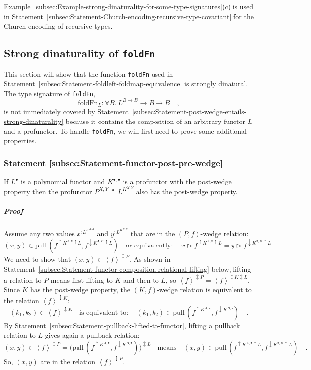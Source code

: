 Example~\ref{subsec:Example-strong-dinaturality-for-some-type-signatures}(c)
is used in Statement~\ref{subsec:Statement-Church-encoding-recursive-type-covariant}
for the Church encoding of recursive types.

\subsection{Strong dinaturality of \texttt{foldFn}}

This section will show that the function \lstinline!foldFn! used
in Statement~\ref{subsec:Statement-foldleft-foldmap-equivalence}
is strongly dinatural. The type signature of \lstinline!foldFn!,
\[
\text{foldFn}_{L}:\forall B.\,L^{B\rightarrow B}\rightarrow B\rightarrow B\quad,
\]
is not immediately covered by Statement~\ref{subsec:Statement-post-wedge-entails-strong-dinaturality}
because it contains the composition of an arbitrary functor $L$ and
a profunctor. To handle \lstinline!foldFn!, we will first need to
prove some additional properties.

\subsubsection{Statement \label{subsec:Statement-functor-post-pre-wedge}\ref{subsec:Statement-functor-post-pre-wedge}}

If $L^{\bullet}$ is a polynomial functor and $K^{\bullet,\bullet}$
is a profunctor with the post-wedge property then the profunctor $P^{X,Y}\triangleq L^{K^{X,Y}}$
also has the post-wedge property.

\subparagraph{Proof}

Assume any two values $x^{:L^{K^{A,A}}}$ and $y^{:L^{K^{B,B}}}$
that are in the $\left(P,f\right)$-wedge relation:
\[
(x,y)\in\text{pull}\,(f^{\uparrow K^{A,\bullet}\uparrow L},f^{\downarrow K^{\bullet,B}\uparrow L})\quad\text{or equivalently}:\quad x\triangleright f^{\uparrow K^{A,\bullet}\uparrow L}=y\triangleright f^{\downarrow K^{\bullet,B}\uparrow L}\quad.
\]
We need to show that $\left(x,y\right)\in\left<f\right>^{\updownarrow P}$.
As shown in Statement~\ref{subsec:Statement-functor-composition-relational-lifting}
below, lifting a relation to $P$ means first lifting to $K$ and
then to $L$, so $\left<f\right>^{\updownarrow P}=\left<f\right>^{\updownarrow K\updownarrow L}$.
Since $K$ has the post-wedge property, the $\left(K,f\right)$-wedge
relation is equivalent to the relation $\left<f\right>^{\updownarrow K}$:
\[
(k_{1},k_{2})\in\left<f\right>^{\updownarrow K}\quad\text{is equivalent to}:\quad(k_{1},k_{2})\in\text{pull}\,(f^{\uparrow K^{A,\bullet}},f^{\downarrow K^{B,\bullet}})\quad.
\]
By Statement~\ref{subsec:Statement-pullback-lifted-to-functor},
lifting a pullback relation to $L$ gives again a pullback relation:
\[
\left(x,y\right)\in\left<f\right>^{\updownarrow P}=\big(\text{pull}\,(f^{\uparrow K^{A,\bullet}},f^{\downarrow K^{B,\bullet}})\big)^{\updownarrow L}\quad\text{means}\quad(x,y)\in\text{pull}\,(f^{\uparrow K^{A,\bullet}\uparrow L},f^{\downarrow K^{\bullet,B}\uparrow L})\quad.
\]
So, $\left(x,y\right)$ are in the relation $\left<f\right>^{\updownarrow P}$.

